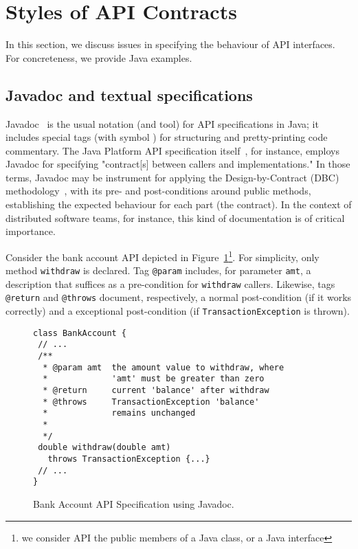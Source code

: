 \section{Styles of API Contracts}
\label{sec:example}

In this section, we discuss issues in specifying the behaviour of API interfaces. For concreteness, we provide Java examples.

\subsection{Javadoc and textual specifications}

Javadoc~\cite{oracle-javadoc} is the usual notation (and tool) for API specifications in Java; it includes special tags (with symbol \@) for structuring and pretty-printing code commentary.
The Java Platform API specification itself~\cite{java-spec}, for instance, employs Javadoc for specifying "contract[s] between callers and implementations."
In those terms, Javadoc may be instrument for applying the Design-by-Contract (DBC) methodology~\cite{dbc}, with its pre- and post-conditions around public methods, establishing the expected behaviour for each part (the contract). In the context of distributed software teams, for instance, this kind of documentation is of critical importance. 


Consider the bank account API depicted in Figure~\ref{Fig-Javadoc-Bank}\footnote{we consider API the public members of a Java class, or a Java interface}. For simplicity, only method {\lstinline!withdraw!} is declared. Tag \lstinline!@param! includes, for parameter \lstinline!amt!, a description that suffices as a pre-condition for \lstinline!withdraw! callers. Likewise, tags \lstinline!@return! and \lstinline!@throws! document, respectively, a normal post-condition (if it works correctly) and a exceptional post-condition (if \lstinline!TransactionException! is thrown).


\begin{figure}
\centering
\begin{lstlisting}[basicstyle=\footnotesize\ttfamily,name=figxpi]
class BankAccount {
 // ...
 /**
  * @param amt  the amount value to withdraw, where
  *             'amt' must be greater than zero 
  * @return     current 'balance' after withdraw
  * @throws     TransactionException 'balance' 
  *             remains unchanged
  *
  */
 double withdraw(double amt) 
   throws TransactionException {...}
 // ...
}
\end{lstlisting}
\caption{Bank Account API Specification using Javadoc.}
\label{Fig-Javadoc-Bank}
\end{figure}



